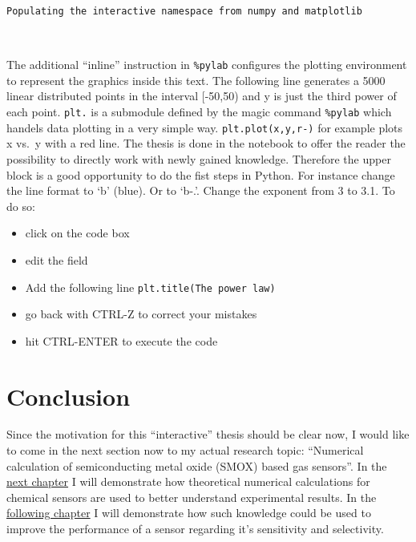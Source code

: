 \documentclass[11pt]{article}
\providecommand{\tightlist}{%
      \setlength{\itemsep}{0pt}\setlength{\parskip}{0pt}}
\begin{document}
    \begin{Verbatim}[commandchars=\\\{\}]
Populating the interactive namespace from numpy and matplotlib
    \end{Verbatim}

    \begin{center}
    \end{center}
    { \hspace*{\fill} \\}
    
    The additional ``inline'' instruction in \texttt{\%pylab} configures the
plotting environment to represent the graphics inside this text. The
following line generates a 5000 linear distributed points in the
interval {[}-50,50) and y is just the third power of each point.
\texttt{plt.} is a submodule defined by the magic command
\texttt{\%pylab} which handels data plotting in a very simple way.
\texttt{plt.plot(x,y,\textquotesingle{}r-\textquotesingle{})} for
example plots x vs.~y with a red line. The thesis is done in the
notebook to offer the reader the possibility to directly work with newly
gained knowledge. Therefore the upper block is a good opportunity to do
the fist steps in Python. For instance change the line format to `b'
(blue). Or to `b-.'. Change the exponent from 3 to 3.1. To do so:

\begin{itemize}
\tightlist
\item
  click on the code box
\item
  edit the field
\item
  Add the following line
  \texttt{plt.title(\textquotesingle{}The\ power\ law\textquotesingle{})}
\item
  go back with CTRL-Z to correct your mistakes
\item
  hit CTRL-ENTER to execute the code
\end{itemize}

    \hypertarget{conclusion}{%
\section{Conclusion}\label{conclusion}}

Since the motivation for this ``interactive'' thesis should be clear
now, I would like to come in the next section now to my actual research
topic: ``Numerical calculation of semiconducting metal oxide (SMOX)
based gas sensors''. In the \href{2-SMOX-sensor-calculation.ipynb}{next
chapter} I will demonstrate how theoretical numerical calculations for
chemical sensors are used to better understand experimental results. In
the \href{3-Applying_theorie-to-practice.ipynb}{following chapter} I
will demonstrate how such knowledge could be used to improve the
performance of a sensor regarding it's sensitivity and selectivity.
\end{document}
